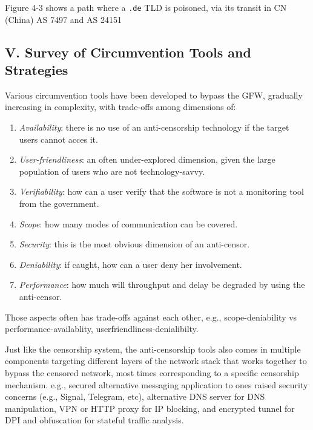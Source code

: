 \documentclass[sigconf]{acmart}
\begin{document}
Figure 4-3 shows a path where a \texttt{.de} TLD is poisoned, via its
transit in CN (China) AS 7497 and AS 24151

\hypertarget{v.-survey-of-circumvention-tools-and-strategies}{%
\subsection{V. Survey of Circumvention Tools and
Strategies}\label{v.-survey-of-circumvention-tools-and-strategies}}

Various circumvention tools have been developed to bypass the GFW,
gradually increasing in complexity, with trade-offs among dimensions of:
\cite{07_taxonomy}

\begin{enumerate}
\def\labelenumi{\arabic{enumi}.}
\item
  \emph{Availability}: there is no use of an anti-censorship technology
  if the target users cannot acces it.
\item
  \emph{User-friendliness}: an often under-explored dimension, given the
  large population of users who are not technology-savvy.
\item
  \emph{Verifiability}: how can a user verify that the software is not a
  monitoring tool from the government.
\item
  \emph{Scope}: how many modes of communication can be covered.
\item
  \emph{Security}: this is the most obvious dimension of an anti-censor.
\item
  \emph{Deniability}: if caught, how can a user deny her involvement.
\item
  \emph{Performance}: how much will throughput and delay be degraded by
  using the anti-censor.
\end{enumerate}

Those aspects often has trade-offs against each other, e.g.,
scope-deniability vs performance-availablity,
userfriendliness-denialibilty.

Just like the censorship system, the anti-censorship tools also comes in
multiple components targeting different layers of the network stack that
works together to bypass the censored network, most times corresponding
to a specific censorship mechanism. e.g., secured alternative messaging
application to ones raised security concerns (e.g., Signal, Telegram,
etc), alternative DNS server for DNS manipulation, VPN or HTTP proxy for
IP blocking, and encrypted tunnel for DPI and obfuscation for stateful
traffic analysis. \cite{48_globalDefeat}
\end{document}
